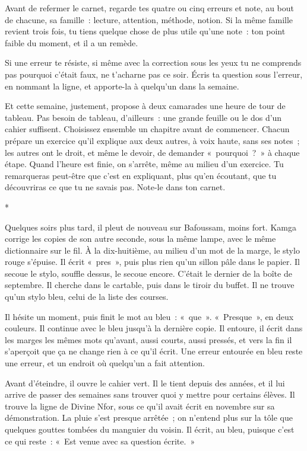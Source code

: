 \documentclass[10.5pt,twoside,openright]{book}
\newcommand{\asterisme}{\par\vspace{0.7em}\centerline{\color{gris}*\quad*\quad*}\vspace{0.7em}\par\noindent}
\begin{document}
Avant de refermer le carnet, regarde tes quatre ou cinq erreurs et note, au bout de chacune, sa famille : lecture, attention, méthode, notion. Si la même famille revient trois fois, tu tiens quelque chose de plus utile qu’une note : ton point faible du moment, et il a un remède.

Si une erreur te résiste, si même avec la correction sous les yeux tu ne comprends pas pourquoi c’était faux, ne t’acharne pas ce soir. Écris ta question sous l’erreur, en nommant la ligne, et apporte-la à quelqu’un dans la semaine.

Et cette semaine, justement, propose à deux camarades une heure de tour de tableau. Pas besoin de tableau, d’ailleurs : une grande feuille ou le dos d’un cahier suffisent. Choisissez ensemble un chapitre avant de commencer. Chacun prépare un exercice qu’il explique aux deux autres, à voix haute, sans ses notes ; les autres ont le droit, et même le devoir, de demander « pourquoi ? » à chaque étape. Quand l’heure est finie, on s’arrête, même au milieu d’un exercice. Tu remarqueras peut-être que c’est en expliquant, plus qu’en écoutant, que tu découvriras ce que tu ne savais pas. Note-le dans ton carnet.

\asterisme

Quelques soirs plus tard, il pleut de nouveau sur Bafoussam, moins fort. Kamga corrige les copies de son autre seconde, sous la même lampe, avec le même dictionnaire sur le fil. À la dix-huitième, au milieu d’un mot de la marge, le stylo rouge s’épuise. Il écrit « pres », puis plus rien qu’un sillon pâle dans le papier. Il secoue le stylo, souffle dessus, le secoue encore. C’était le dernier de la boîte de septembre. Il cherche dans le cartable, puis dans le tiroir du buffet. Il ne trouve qu’un stylo bleu, celui de la liste des courses.

Il hésite un moment, puis finit le mot au bleu : « que ». « Presque », en deux couleurs. Il continue avec le bleu jusqu’à la dernière copie. Il entoure, il écrit dans les marges les mêmes mots qu’avant, aussi courts, aussi pressés, et vers la fin il s’aperçoit que ça ne change rien à ce qu’il écrit. Une erreur entourée en bleu reste une erreur, et un endroit où quelqu’un a fait attention.

Avant d’éteindre, il ouvre le cahier vert. Il le tient depuis des années, et il lui arrive de passer des semaines sans trouver quoi y mettre pour certains élèves. Il trouve la ligne de Divine Nfor, sous ce qu’il avait écrit en novembre sur sa démonstration. La pluie s’est presque arrêtée ; on n’entend plus sur la tôle que quelques gouttes tombées du manguier du voisin. Il écrit, au bleu, puisque c’est ce qui reste : « Est venue avec sa question écrite. »
\end{document}
